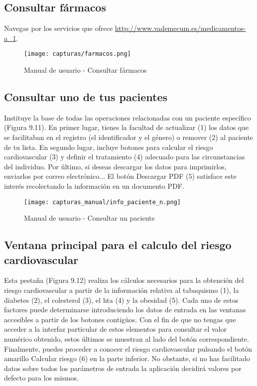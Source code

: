 \documentclass[11pt,spanish,
		listoftables,listoffigures]
		{tfgplantilla}
\begin{document}
\newpage
\subsection {Consultar fármacos}

Navegas por los servicios que ofrece \url {http://www.vademecum.es/medicamentos-a_1}.

\begin{figure}[H]
\centering
\texttt{[image: capturas/farmacos.png]}
\caption{Manual de usuario - Consultar fármacos}
\end{figure}

\subsection {Consultar uno de tus pacientes}

Instituye la base de todas las operaciones relacionadas con un paciente específico (Figura 9.11). En primer lugar, tienes la facultad de actualizar (1) los datos que se facilitaban en el registro (el identificador y el género) o remover (2) al paciente de tu lista. En segundo lugar, incluye botones para calcular el riesgo cardiovascular (3) y definir el tratamiento (4) adecuado para las circunstancias del individuo. Por último, si deseas descargar los datos para imprimirlos, enviarlos por correo electrónico... El botón \textquotedbl Descargar PDF\textquotedbl{} (5) satisface este interés recolectando la información en un documento PDF.

\begin{figure}[H]
\centering
\texttt{[image: capturas\_manual/info\_paciente\_n.png]}
\caption{Manual de usuario - Consultar un paciente}
\end{figure}

\newpage
\subsection {Ventana principal para el calculo del riesgo cardiovascular}

Esta pestaña (Figura 9.12) realiza los cálculos necesarios para la obtención del riesgo cardiovascular a partir de la información relativa al tabaquismo (1), la diabetes (2), el colesterol (3), el hta (4) y la obesidad (5). Cada uno de estos factores puede determinarse introduciendo los datos de entrada en las ventanas accesibles a partir de los botones contigüos. Con el fin de que no tengas que acceder a la interfaz particular de estos elementos para consultar el valor numérico obtenido, estos últimos se muestran al lado del botón correspondiente. Finalmente, puedes proceder a conocer el riesgo cardiovascular pulsando el botón amarillo \textquotedbl Calcular riesgo\textquotedbl{} (6) en la parte inferior. No obstante, si no has facilitado datos sobre todos los parámetros de entrada la aplicación decidirá valores por defecto para los mismos.
\end{document}
